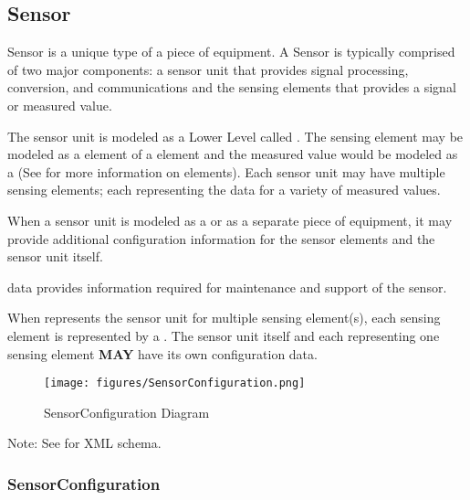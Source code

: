 \subsection{Sensor} 


\gls{Sensor} is a unique type of a piece of equipment.  A \gls{Sensor} is typically comprised of two major components: a \gls{sensor unit} that provides signal processing, conversion, and communications and the \glspl{sensing element} that provides a signal or measured value.

The \gls{sensor unit} is modeled as a \gls{Lower Level}  called .  The \gls{sensing element} may be modeled as a  element of a  element and the measured value would be modeled as a  (See  for more information on  elements).  Each \gls{sensor unit} may have multiple \glspl{sensing element}; each representing the data for a variety of measured values.

When a \gls{sensor unit} is modeled as a  or as a separate piece of equipment, it may provide additional configuration information for the \glspl{sensor element} and the \gls{sensor unit} itself.  

 data provides information required for maintenance and support of the sensor.

When  represents the \gls{sensor unit} for multiple \gls{sensing element}(s), each sensing element is represented by a .   The \gls{sensor unit} itself and each  representing one \gls{sensing element} \textbf{MAY} have its own configuration data.

\begin{figure}[ht]
  \centering
    \texttt{[image: figures/SensorConfiguration.png]}
  \caption{SensorConfiguration Diagram}
  \label{fig:SensorConfiguration Diagram}
\end{figure}

\FloatBarrier


Note: See  for XML schema.



\subsubsection{SensorConfiguration}
\label{sec:SensorConfiguration}



